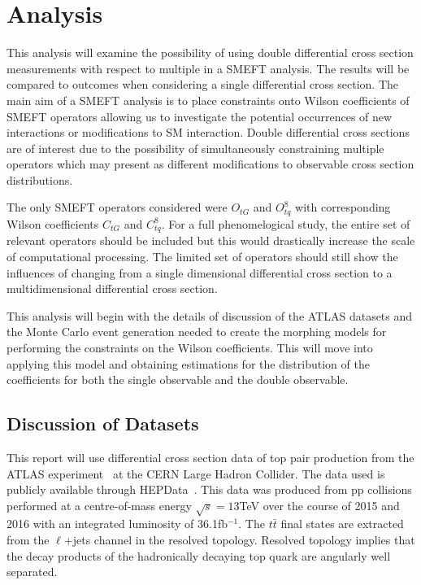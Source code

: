 \documentclass[a4paper,11pt]{article}
\begin{document}

\section{Analysis}
This analysis will examine the possibility of using double differential cross section measurements with respect to multiple in a SMEFT analysis.
The results will be compared to outcomes when considering a single differential cross section.
The main aim of a SMEFT analysis is to place constraints onto Wilson coefficients of SMEFT operators allowing us to investigate the potential occurrences of new interactions or modifications to SM interaction.
Double differential cross sections are of interest due to the possibility of simultaneously constraining multiple operators which may present as different modifications to observable cross section distributions.

The only SMEFT operators considered were $O_{tG}$ and $O_{tq}^{8}$ with corresponding Wilson coefficients $C_{tG}$ and $C_{tq}^8$.
For a full phenomelogical study, the entire set of relevant operators should be included but this would drastically increase the scale of computational processing.
The limited set of operators should still show the influences of changing from a single dimensional differential cross section to a multidimensional differential cross section.

This analysis will begin with the details of discussion of the ATLAS datasets and the Monte Carlo event generation needed to create the morphing models for performing the constraints on the Wilson coefficients.
This will move into applying this model and obtaining estimations for the distribution of the coefficients for both the single observable and the double observable.

\subsection{Discussion of Datasets}
This report will use differential cross section data of top pair production from the ATLAS experiment~\cite{ATLAS:2019hxz} at the CERN Large Hadron Collider.
The data used is publicly available through HEPData~\cite{hepdata1750330}.
This data was produced from pp collisions performed at a centre-of-mass energy $\sqrt{s} = 13$TeV over the course of 2015 and 2016 with an integrated luminosity of 36.1fb$^{-1}$.
The $t\bar{t}$ final states are extracted from the $\ell$+jets channel in the resolved topology.
Resolved topology implies that the decay products of the hadronically decaying top quark are angularly well separated.
\end{document}
